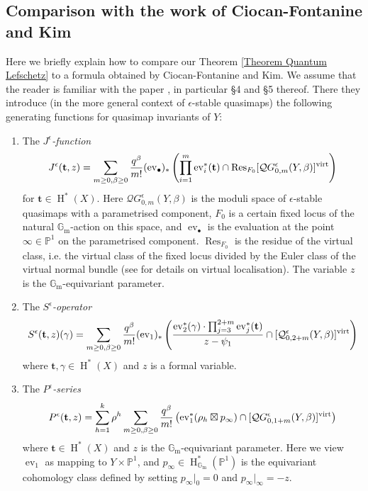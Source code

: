 \documentclass[11pt]{amsart}
\newcommand{\Qe}[4]{\mathcal{Q}^{\epsilon}_{#1,#2}(#3,#4)}
\newcommand{\QGe}[4]{\mathcal{Q}G^{\epsilon}_{#1,#2}(#3,#4)}
\newcommand{\PP}{\mathbb P}
\newcommand{\Gm}{\mathbb{G}_{\text{m}}}
\newcommand{\virt}[1]{[#1]^{\operatorname{virt}}}
\newcommand{\HH}{\operatorname{H}}
\newcommand{\ev}{\operatorname{ev}}
\theoremstyle{definition}
\theoremstyle{definition}
\begin{document}
\subsection{Comparison with the work of Ciocan-Fontanine and Kim} \label{Subsection CFK comparison}
Here we briefly explain how to compare our Theorem \ref{Theorem Quantum Lefschetz} to a formula obtained by Ciocan-Fontanine and Kim. We assume that the reader is familiar with the paper \cite{CF-K-wallcrossing}, in particular \S4 and \S5 thereof. There they introduce (in the more general context of $\epsilon$-stable quasimaps) the following generating functions for quasimap invariants of $Y$:
\begin{enumerate}
\item The \emph{$J^{\epsilon}$-function}
\begin{equation*} J^\epsilon({\bf t}, z)=\sum_{m\geq 0,\beta\geq 0} \dfrac{q^\beta}{m!} (\ev_\bullet)_*\left( \prod_{i=1}^m \ev_i^*({\bf t}) \cap\operatorname{Res}_{F_0} \virt{\QGe{0}{m}{Y}{\beta}} \right) \end{equation*}
for $\mathbf{t} \in \HH^*(X)$. Here $\QGe{0}{m}{Y}{\beta}$ is the moduli space of $\epsilon$-stable  quasimaps with a parametrised component, $F_0$ is a certain fixed locus of the natural $\Gm$-action on this space, and $\ev_\bullet$ is the evaluation at the point $\infty \in \PP^1$ on the parametrised component. $\operatorname{Res}_{F_0}$ is the residue of the virtual class, i.e. the virtual class of the fixed locus divided by the Euler class of the virtual normal bundle (see \cite{GraberPandharipande} for details on virtual localisation). The variable $z$ is the $\Gm$-equivariant parameter.
\item The \emph{$S^\epsilon$-operator}
\begin{equation*}
 S^\epsilon(\mathbf{t},z)(\gamma)=\sum_{m\ge 0,\beta\ge 0}\frac{q^\beta}{m!} 
(\ev_1)_*\left( \dfrac{\ev_2^*(\gamma) \cdot \prod_{j=3}^{2+m} \ev_j^*({\bf t})}{z-\psi_1} \cap\virt{\Qe{0}{2+m}{Y}{\beta}} \right)
\end{equation*}
where $\mathbf{t}, \gamma \in \HH^*(X)$ and $z$ is a formal variable.
\item The \emph{$P^\epsilon$-series}
\begin{equation*}
 P^\epsilon({\bf t}, z)=\sum_{h=1}^k \rho^h \sum_{m\geq 0,\beta\geq 0} \frac{q^\beta }{m!} \left( \ev_1^*(\rho_h \boxtimes p_\infty) \cap \virt{\QGe{0}{1+m}{Y}{\beta}} \right) \end{equation*}
where $\mathbf{t} \in \HH^*(X)$ and $z$ is the $\Gm$-equivariant parameter. Here we view $\ev_1$ as mapping to $Y \times \PP^1$, and $p_\infty\in \HH^*_{\Gm}(\PP^1)$ is the equivariant cohomology class defined by setting $p_{\infty}|_0 =0$ and $p_{\infty}|_{\infty}=-z$.
\end{enumerate}
\end{document}
